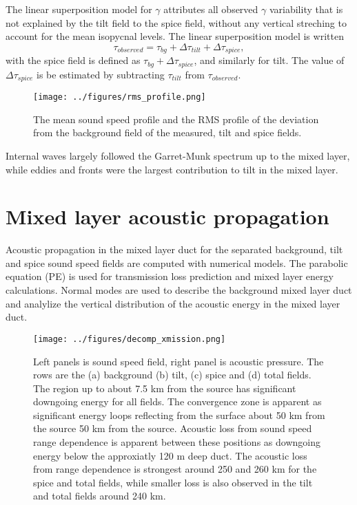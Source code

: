 \documentclass[preprint,NumberedRefs]{JASA}
\begin{document}
The linear superposition model for $\gamma$ attributes all observed $\gamma$ variability that is not explained by the tilt field to the spice field, without any vertical streching to account for the mean isopycnal levels. The linear superposition model is written
\begin{equation}
    \tau_{observed} = \tau_{bg} + \Delta \tau_{tilt} + \Delta \tau_{spice},
\end{equation}
with the spice field is defined as $\tau_{bg} + \Delta \tau_{spice}$, and similarly for tilt. The value of $\Delta \tau_{spice}$ is be estimated by subtracting $\tau_{tilt}$ from $\tau_{observed}$.

\begin{figure}
\texttt{[image: ../figures/rms\_profile.png]}
    \caption{\label{fig:c_rms}{The mean sound speed profile and the RMS profile of the deviation from the background field of the measured, tilt and spice fields. }}
\end{figure}

Internal waves largely followed the Garret-Munk spectrum up to the mixed layer, while eddies and fronts were the largest contribution to tilt in the mixed layer.

\section{\label{sec:propagation}Mixed layer acoustic propagation}
Acoustic propagation in the mixed layer duct for the separated background, tilt and spice sound speed fields are computed with numerical models. The parabolic equation (PE) is used for transmission loss prediction and mixed layer energy calculations. Normal modes are used to describe the background mixed layer duct and analylize the vertical distribution of the acoustic energy in the mixed layer duct.

\begin{figure}
\texttt{[image: ../figures/decomp\_xmission.png]}
    \caption{\label{fig:decomp_x}{Left panels is sound speed field, right panel is acoustic pressure. The rows are the (a) background (b) tilt, (c) spice and (d) total fields. The region up to about 7.5 km from the source has significant downgoing energy for all fields. The convergence zone is apparent as significant energy loops reflecting from the surface about 50 km from the source 50 km from the source. Acoustic loss from sound speed range dependence is apparent between these positions as downgoing energy below the approxiatly 120 m deep duct. The acoustic loss from range dependence is strongest around 250 and 260 km for the spice and total fields, while smaller loss is also observed in the tilt and total fields around 240 km.}}
\end{figure}
\end{document}
